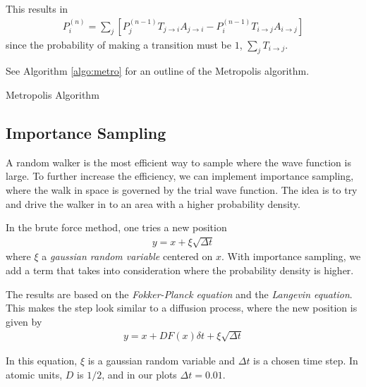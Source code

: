 \documentclass[twocolumns, a4paper,11pt,fleqn]{extarticle}
\newcommand{\eq}[1]{{\small\begin{align*}#1\end{align*}}}
\begin{document}
This results in
\eq{
  P_{i}^{(n)} = 
  \sum_j \left[
  P_{j}^{(n-1)} T_{j\rightarrow i} A_{j\rightarrow i}-
  P_{i}^{(n-1)} T_{i\rightarrow j} A_{i\rightarrow j}
  \right]
}
since the probability of making a transition must be $1$, $\sum_j T_{i\rightarrow j}$.


See Algorithm \ref{algo:metro} for an outline of the Metropolis algorithm.

\begin{algorithm}[H]
	\caption{Metropolis Algorithm}\label{algo:metro}
  \begin{algorithmic}[1]
    \EndProcedure
  \end{algorithmic}
\end{algorithm}

\subsection{Importance Sampling}
A random walker is the most efficient way to sample where the
wave function is large. To further increase the efficiency, we can implement importance
sampling, where the walk in space is governed by the trial wave function.
The idea is to try and drive the walker in to an area with a higher probability
density.

In the brute force method, one tries a new position
\eq{
  y = x + \xi \sqrt{\Delta t}
}
where $\xi$ a \textit{gaussian random variable} centered on $x$.
With importance sampling, we add a term that takes into consideration
where the probability density is higher.

The results are based on the 
\textit{Fokker-Planck equation} and the \textit{Langevin 
equation}. This makes the step look similar to a diffusion process,
where the new position is given by
\begin{align*}
y = x + DF(x) \delta t + \xi \sqrt{\Delta t}
\end{align*}

In this equation, $\xi $ is a gaussian random variable 
and $\Delta t$ is a chosen time step.
In atomic units, $D$ is $1/2$, and in our plots $\Delta t = 0.01$. 
\end{document}
